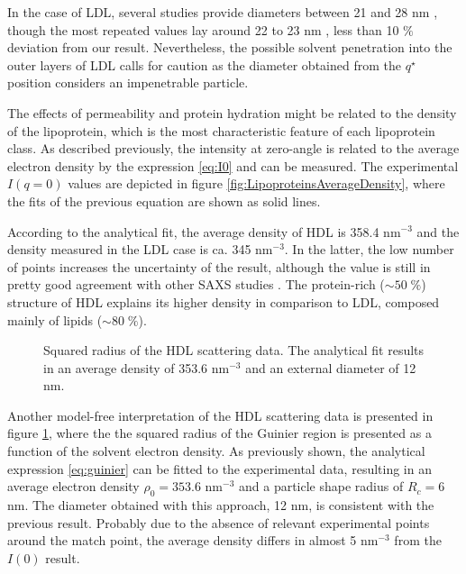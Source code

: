 In the case of LDL, several studies provide diameters between 21 and 28 nm \citep{tardieu_structure_1976,colhoun_lipoprotein_2002,german_lipoproteins:_2006}, though the most repeated values lay around 22 to 23 nm \citep{muller_structure_1978,luzzati_structure_1979}, less than 10 $\%$ deviation from our result. Nevertheless, the possible solvent penetration into the outer layers of LDL \citep{stuhrmann_neutron_1975,tardieu_structure_1976} calls for caution as the diameter obtained from the $q^{\star}$ position considers an impenetrable particle.

The effects of permeability and protein hydration might be related to the density of the lipoprotein, which is the most characteristic feature of each lipoprotein class. As described previously, the intensity at zero-angle is related to the average electron density by the expression \ref{eq:I0} and can be measured. The experimental $I(q=0)$ values are depicted in figure \ref{fig:LipoproteinsAverageDensity}, where the fits of the previous equation are shown as solid lines. 

According to the analytical fit, the average density of HDL is 358.4 nm$^{-3}$ and the density measured in the LDL case is ca. 345 nm$^{-3}$. In the latter, the low number of points increases the uncertainty of the result, although the value is still in pretty good agreement with other SAXS studies \citep{tardieu_structure_1976,luzzati_structure_1979}. The protein-rich ($\sim 50 \; \% $) structure of HDL explains its higher density in comparison to LDL, composed mainly of lipids ($\sim 80 \; \% $). 

\begin{figure}
	\centering
		
		\caption[Squared radius of the HDL scattering data.]{Squared radius of the HDL scattering data. The analytical fit results in an average density of 353.6 nm$^{-3}$ and an external diameter of 12 nm.}
		\label{fig:HDLGuinierRadius}
\end{figure}

Another model-free interpretation of the HDL scattering data is presented in figure \ref{fig:HDLGuinierRadius}, where the the squared radius of the Guinier region is presented as a function of the solvent electron density. As previously shown, the analytical expression \ref{eq:guinier} can be fitted to the experimental data, resulting in an average electron density $\rho_0=353.6$ nm$^{-3}$ and a particle shape radius of $R_c=6$ nm. The diameter obtained with this approach, 12 nm, is consistent with the previous result. Probably due to the absence of relevant experimental points around the match point, the average density differs in almost 5 nm$^{-3}$ from the $I(0)$ result.

